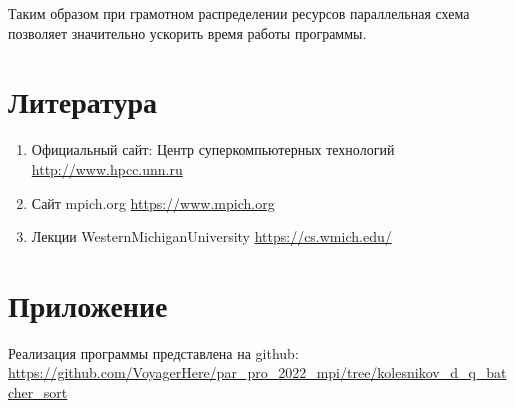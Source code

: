 \documentclass[oneside,final,14pt]{extreport}
\begin{document}
Таким образом при грамотном распределении ресурсов параллельная схема позволяет значительно ускорить время работы программы. 
\chapter{Литература}
\begin{enumerate}
    \item Официальный сайт: Центр суперкомпьютерных технологий
    \url{http://www.hpcc.unn.ru}
    \item Сайт mpich.org \url{https://www.mpich.org}
    \item Лекции WesternMichiganUniversity \url{https://cs.wmich.edu/}
\end{enumerate}
\chapter{Приложение}
Реализация программы представлена на github:
\url{https://github.com/VoyagerHere/par_pro_2022_mpi/tree/kolesnikov_d_q_batcher_sort}
\end{document}
